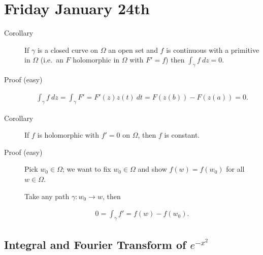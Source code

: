 \hypertarget{friday-january-24th}{%
\section{Friday January 24th}\label{friday-january-24th}}

\begin{description}
\item[Corollary]
If \(\gamma\) is a closed curve on \(\Omega\) an open set and \(f\) is
continuous with a primitive in \(\Omega\) (i.e.~an \(F\) holomorphic in
\(\Omega\) with \(F'=f\)) then \(\int_\gamma f ~dz = 0\).
\item[Proof (easy)]
\begin{align*}
\int_\gamma f ~dz = \int_\gamma F' = F'(z) z(t) ~dt  = F(z(b)) - F(z(a)) = 0
.\end{align*}
\item[Corollary]
If \(f\) is holomorphic with \(f'=0\) on \(\Omega\), then \(f\) is
constant.
\item[Proof (easy)]
Pick \(w_0 \in \Omega\); we want to fix \(w_0 \in \Omega\) and show
\(f(w) = f(w_0)\) for all \(w\in \Omega\).

Take any path \(\gamma: w_0 \to w\), then

\begin{align*}
0 = \int_\gamma f' = f(w) - f(w_0)
.\end{align*}
\end{description}

\hypertarget{integral-and-fourier-transform-of-e-x2}{%
\subsection{\texorpdfstring{Integral and Fourier Transform of
\(e^{-x^2}\)}{Integral and Fourier Transform of e\^{}\{-x\^{}2\}}}\label{integral-and-fourier-transform-of-e-x2}}

